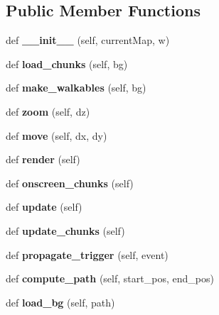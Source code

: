 \subsection*{Public Member Functions}
\begin{DoxyCompactItemize}
\item 
\hypertarget{classsrc_1_1map_1_1_map_viewer_a75be6f6a2baad2f2160e23a95da7aaf4}{}\label{classsrc_1_1map_1_1_map_viewer_a75be6f6a2baad2f2160e23a95da7aaf4} 
def {\bfseries \+\_\+\+\_\+init\+\_\+\+\_\+} (self, current\+Map, w)
\item 
\hypertarget{classsrc_1_1map_1_1_map_viewer_a19bb01b0a43735172573553c73844460}{}\label{classsrc_1_1map_1_1_map_viewer_a19bb01b0a43735172573553c73844460} 
def {\bfseries load\+\_\+chunks} (self, bg)
\item 
\hypertarget{classsrc_1_1map_1_1_map_viewer_a9c4ef537bfa420827d6f77e334da92c6}{}\label{classsrc_1_1map_1_1_map_viewer_a9c4ef537bfa420827d6f77e334da92c6} 
def {\bfseries make\+\_\+walkables} (self, bg)
\item 
\hypertarget{classsrc_1_1map_1_1_map_viewer_a1da0b6bad12fcac7c618670f75a6eace}{}\label{classsrc_1_1map_1_1_map_viewer_a1da0b6bad12fcac7c618670f75a6eace} 
def {\bfseries zoom} (self, dz)
\item 
\hypertarget{classsrc_1_1map_1_1_map_viewer_abe60e1e786286a9efa206dc54dfd0e6b}{}\label{classsrc_1_1map_1_1_map_viewer_abe60e1e786286a9efa206dc54dfd0e6b} 
def {\bfseries move} (self, dx, dy)
\item 
\hypertarget{classsrc_1_1map_1_1_map_viewer_a72eff7b08c2b38ad488c583e1f61fc41}{}\label{classsrc_1_1map_1_1_map_viewer_a72eff7b08c2b38ad488c583e1f61fc41} 
def {\bfseries render} (self)
\item 
\hypertarget{classsrc_1_1map_1_1_map_viewer_a4c09e4be9900dc84a2f11505ac53600e}{}\label{classsrc_1_1map_1_1_map_viewer_a4c09e4be9900dc84a2f11505ac53600e} 
def {\bfseries onscreen\+\_\+chunks} (self)
\item 
\hypertarget{classsrc_1_1map_1_1_map_viewer_a216b54b52c7e9d6f6aef0ac07bd3c571}{}\label{classsrc_1_1map_1_1_map_viewer_a216b54b52c7e9d6f6aef0ac07bd3c571} 
def {\bfseries update} (self)
\item 
\hypertarget{classsrc_1_1map_1_1_map_viewer_a62ed9f1b1e0bdfc73b183eb72c56ce68}{}\label{classsrc_1_1map_1_1_map_viewer_a62ed9f1b1e0bdfc73b183eb72c56ce68} 
def {\bfseries update\+\_\+chunks} (self)
\item 
\hypertarget{classsrc_1_1map_1_1_map_viewer_a4c1ad1d960c47d2879ccaa3e85a15980}{}\label{classsrc_1_1map_1_1_map_viewer_a4c1ad1d960c47d2879ccaa3e85a15980} 
def {\bfseries propagate\+\_\+trigger} (self, event)
\item 
\hypertarget{classsrc_1_1map_1_1_map_viewer_acb4408de9fbaefa601d9f2b5fdd87e33}{}\label{classsrc_1_1map_1_1_map_viewer_acb4408de9fbaefa601d9f2b5fdd87e33} 
def {\bfseries compute\+\_\+path} (self, start\+\_\+pos, end\+\_\+pos)
\item 
\hypertarget{classsrc_1_1map_1_1_map_viewer_af4ee9622b437686e6b952f7af3122018}{}\label{classsrc_1_1map_1_1_map_viewer_af4ee9622b437686e6b952f7af3122018} 
def {\bfseries load\+\_\+bg} (self, path)
\end{DoxyCompactItemize}
